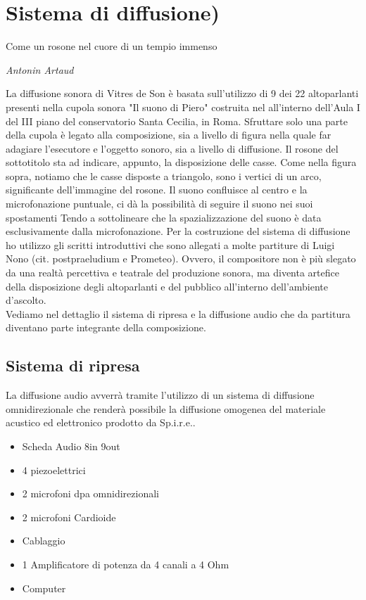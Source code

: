 
\chapter{Sistema di diffusione)}
\label{chp:Sistema di diffusione}

\epigraph{Come un rosone nel cuore di un tempio immenso}{\textit{Antonin Artaud}}

La diffusione sonora di Vitres de Son è basata sull'utilizzo di 9 dei 22 altoparlanti presenti nella cupola sonora "Il suono di Piero" costruita nel all'interno dell'Aula I del III piano del conservatorio Santa Cecilia, in Roma. Sfruttare solo una parte della cupola è legato alla composizione, sia a livello di figura nella quale far adagiare l'esecutore e l'oggetto sonoro, sia a livello di diffusione. Il rosone del sottotitolo sta ad indicare, appunto, la disposizione delle casse. Come nella figura sopra, notiamo che le casse disposte a triangolo, sono i vertici di un arco, significante dell'immagine del rosone. Il suono confluisce al centro e la microfonazione puntuale, ci dà la possibilità di seguire il suono nei suoi spostamenti 
Tendo a sottolineare che la spazializzazione del suono è data esclusivamente dalla microfonazione.
Per la costruzione del sistema di diffusione ho utilizzo gli scritti introduttivi che sono allegati a molte partiture di Luigi Nono (cit. postpraeludium e Prometeo). Ovvero, il compositore non è più slegato da una realtà percettiva e teatrale del produzione sonora, ma diventa artefice della disposizione degli altoparlanti e del pubblico all'interno dell'ambiente d'ascolto. \\
Vediamo nel dettaglio il sistema di ripresa e la diffusione audio che da partitura diventano parte integrante della composizione.

\section{Sistema di ripresa}
La diffusione audio avverrà tramite l'utilizzo di un sistema di diffusione omnidirezionale che renderà possibile la diffusione omogenea del materiale acustico ed elettronico prodotto da Sp.i.r.e.. \\

\begin{itemize}
	\item{Scheda Audio 8in 9out}
	\item{4 piezoelettrici}
	\item{2 microfoni dpa omnidirezionali}
	\item{2 microfoni Cardioide}
	\item{Cablaggio}
	\item{1 Amplificatore di potenza da 4 canali a 4 Ohm}
	\item{Computer}
\end{itemize}

